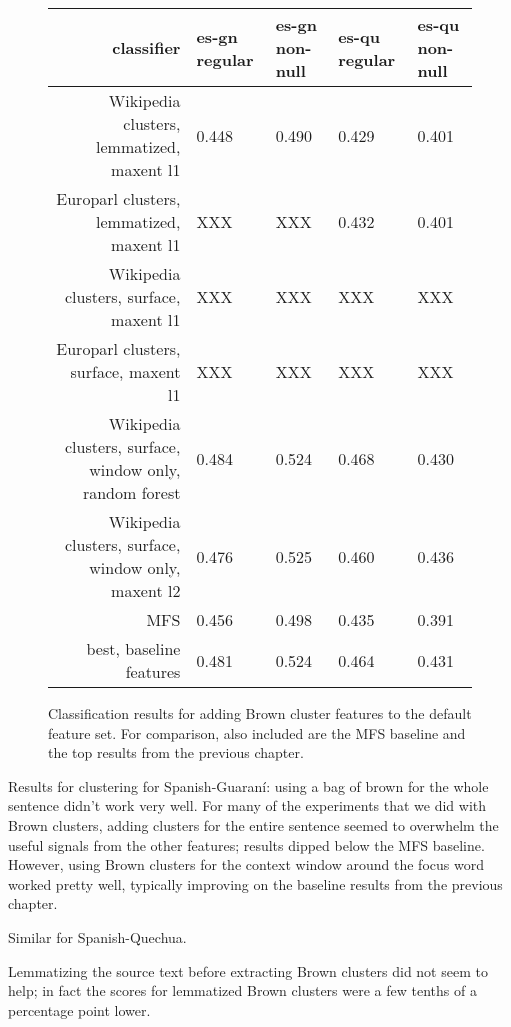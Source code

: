 \begin{figure*}
  \begin{centering}
  \begin{tabulary}{\textwidth}{|R|L|L|L|L|}
    \hline
    classifier & es-gn regular & es-gn non-null & es-qu regular & es-qu non-null \\
    \hline
    Wikipedia clusters, lemmatized, maxent l1 & 0.448 & 0.490 & 0.429 & 0.401 \\
    \hline
    Europarl clusters, lemmatized, maxent l1 & XXX & XXX & 0.432 & 0.401 \\
    \hline
    Wikipedia clusters, surface, maxent l1 & XXX & XXX & XXX & XXX \\
    \hline
    Europarl clusters, surface, maxent l1 & XXX & XXX & XXX & XXX \\
    \hline
    Wikipedia clusters, surface, window only, random forest & 0.484 & 0.524 & 0.468 & 0.430 \\
    \hline
    Wikipedia clusters, surface, window only, maxent l2 & 0.476 & 0.525 & 0.460 & 0.436 \\
    \hline
    MFS    & 0.456 & 0.498 & 0.435 & 0.391 \\
    \hline
    best, baseline features & 0.481 & 0.524 & 0.464 & 0.431 \\
    \hline
  \end{tabulary}
  \end{centering}
  \caption{Classification results for adding Brown cluster features to the
  default feature set. For comparison, also included are the MFS baseline and
  the top results from the previous chapter.}
  \label{fig:brown-results}
\end{figure*}


Results for clustering for Spanish-Guaraní:
using a bag of brown for the whole sentence didn't work very well. For many of
the experiments that we did with Brown clusters, adding clusters for the entire
sentence seemed to overwhelm the useful signals from the other features;
results dipped below the MFS baseline.
However, using Brown clusters for the context window around the focus word
worked pretty well, typically improving on the baseline results from the
previous chapter.

Similar for Spanish-Quechua.

Lemmatizing the source text before extracting Brown clusters did not seem to
help; in fact the scores for lemmatized Brown clusters were a few tenths of a
percentage point lower.  

